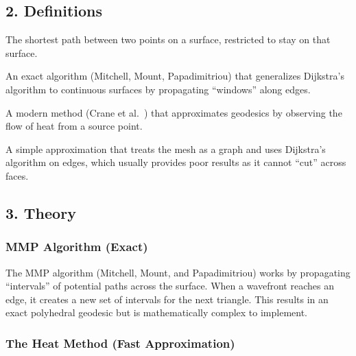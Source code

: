 \subsection{2. Definitions}

\begin{definition}[Geodesic]\label{def:geodesic}
The shortest path between two points on a surface, restricted to stay on that surface.
\end{definition}

\begin{definition}\label{def:mmp_algorithm}
An exact algorithm (Mitchell, Mount, Papadimitriou\cite{mitchell1987}) that generalizes Dijkstra's algorithm to continuous surfaces by propagating ``windows'' along edges.
\end{definition}

\begin{definition}\label{def:heat_method}
A modern method (Crane et al.\ \cite{crane2013geodesic}) that approximates geodesics by observing the flow of heat from a source point.
\end{definition}

\begin{definition}\label{def:edge_walking}
A simple approximation that treats the mesh as a graph and uses Dijkstra's algorithm on edges, which usually provides poor results as it cannot ``cut'' across faces.
\end{definition}

\subsection{3. Theory}

\subsubsection{MMP Algorithm (Exact)}

The MMP algorithm (Mitchell, Mount, and Papadimitriou\cite{mitchell1987}) works by propagating ``intervals'' of potential paths across the surface. When a wavefront reaches an edge, it creates a new set of intervals for the next triangle. This results in an exact polyhedral geodesic but is mathematically complex to implement.

\subsubsection{The Heat Method (Fast Approximation)}

